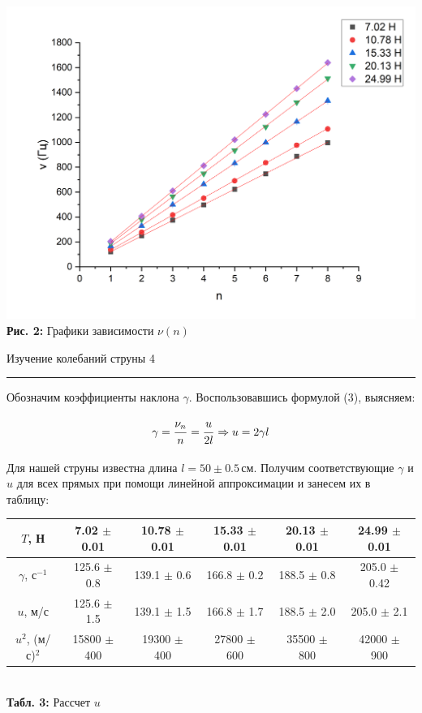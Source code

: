\documentclass[12pt,a4paper]{scrartcl}
\begin{document}
	\begin{center}
		\includegraphics[scale=0.5]{PIC_2.png}
		\\\textbf{Рис. 2: } Графики зависимости $\nu(n)$
	\end{center}

	
	\newpage
	
	\begin{flushleft}
		\footnotesize{Изучение колебаний струны} \hspace{\fill} \footnotesize{4}
		\\[-0.3cm]\noindent\rule{\textwidth}{0.3pt}
	\end{flushleft}

	Обозначим коэффициенты наклона $\gamma$. Воспользовавшись формулой (3), выясняем:
	
	$$\gamma = \dfrac{\strut \nu_n}{\strut n} = \dfrac{\strut u}{\strut 2l} \Rightarrow u = 2\gamma l$$
	
	Для нашей струны известна длина $l = 50\pm 0.5\,\text{см}$. Получим соответствующие $\gamma$ и $u$ для всех прямых при помощи линейной аппроксимации и занесем их в таблицу:
	
	\begin{center}
		\begin{tabular}{|c|c|c|c|c|c|}
			\hline
			$T$, Н & 7.02 $\pm$ 0.01 & 10.78 $\pm$ 0.01 & 15.33 $\pm$ 0.01 & 20.13 $\pm$ 0.01 & 24.99 $\pm$ 0.01
			\\\hline
			$\gamma$, с$^{-1}$ & 125.6 $\pm$ 0.8 & 139.1 $\pm$ 0.6 & 166.8 $\pm$ 0.2 & 188.5 $\pm$ 0.8 & 205.0 $\pm$ 0.42
			\\\hline
			$u$, м/с & 125.6 $\pm$ 1.5 & 139.1 $\pm$ 1.5 & 166.8 $\pm$ 1.7 & 188.5 $\pm$ 2.0 & 205.0 $\pm$ 2.1
			\\\hline
			$u^2$, (м/с)$^2$ & 15800 $\pm$ 400 & 19300 $\pm$ 400 & 27800 $\pm$ 600 & 35500 $\pm$ 800 & 42000 $\pm$ 900
			\\\hline
		\end{tabular}
		\\\textbf{Табл. 3: } Рассчет $u$
	\end{center}
\end{document}
